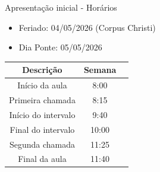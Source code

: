 
\begin{frame}{Apresentação inicial - Horários}
    \begin{itemize}
        \item Feriado: 04/05/2026 (Corpus Christi)
        \item Dia Ponte: 05/05/2026 
    \end{itemize}

    \vspace{1.0cm}
    \centering
    \begin{tabular}{|c|c|c|}
        \hline
        Descrição & Semana \\
        \hline
        Início da aula   & 8:00   \\
        Primeira chamada   & 8:15   \\
        Início do intervalo  & 9:40   \\
        Final do intervalo   & 10:00   \\
        Segunda chamada   & 11:25   \\
        Final da aula   & 11:40   \\
        \hline
    \end{tabular}
\end{frame}